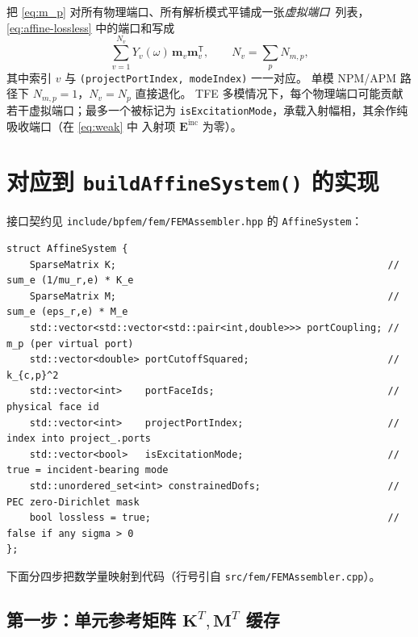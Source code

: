 \documentclass[UTF8,a4paper,11pt]{ctexart}
\newcommand{\transpose}{\mathsf{T}}
\newcommand{\code}[1]{\texttt{\small #1}}
\begin{document}
把 \eqref{eq:m_p} 对所有物理端口、所有解析模式平铺成一张\emph{虚拟端口}\ 列表，
\eqref{eq:affine-lossless} 中的端口和写成
\begin{equation}
    \sum_{v=1}^{N_v}Y_v(\omega)\,\bm m_v\bm m_v^{\transpose},\qquad
    N_v=\sum_p N_{m,p},
\end{equation}
其中索引 $v$ 与 \code{(projectPortIndex, modeIndex)} 一一对应。
单模 NPM/APM 路径下 $N_{m,p}=1$，$N_v=N_p$ 直接退化。
TFE 多模情况下，每个物理端口可能贡献若干虚拟端口；最多一个被标记为
\code{isExcitationMode}，承载入射幅相，其余作纯吸收端口（在 \eqref{eq:weak} 中
入射项 $\bm E^{\text{inc}}$ 为零）。

\section{\texorpdfstring{对应到 \code{buildAffineSystem()} 的实现}{对应到 buildAffineSystem() 的实现}}
\label{sec:impl}

接口契约见 \code{include/bpfem/fem/FEMAssembler.hpp} 的 \code{AffineSystem}：
\begin{lstlisting}
struct AffineSystem {
    SparseMatrix K;                                               // sum_e (1/mu_r,e) * K_e
    SparseMatrix M;                                               // sum_e (eps_r,e) * M_e
    std::vector<std::vector<std::pair<int,double>>> portCoupling; // m_p (per virtual port)
    std::vector<double> portCutoffSquared;                        // k_{c,p}^2
    std::vector<int>    portFaceIds;                              // physical face id
    std::vector<int>    projectPortIndex;                         // index into project_.ports
    std::vector<bool>   isExcitationMode;                         // true = incident-bearing mode
    std::unordered_set<int> constrainedDofs;                      // PEC zero-Dirichlet mask
    bool lossless = true;                                         // false if any sigma > 0
};
\end{lstlisting}
下面分四步把数学量映射到代码（行号引自 \code{src/fem/FEMAssembler.cpp}）。

\subsection{\texorpdfstring{第一步：单元参考矩阵 $\bm K^T,\bm M^T$ 缓存}{第一步：单元参考矩阵 K\^{}T, M\^{}T 缓存}}
\label{sec:step-cache}
\end{document}
